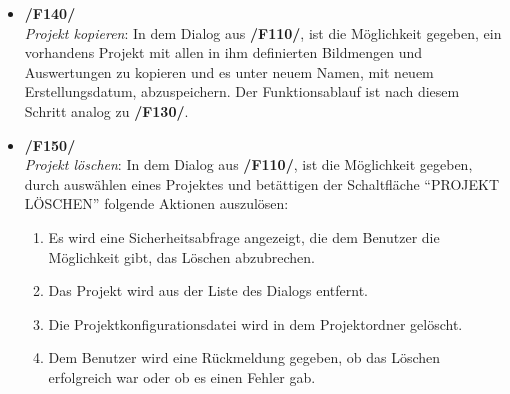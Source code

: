 \begin{itemize}
		\item \textbf{/F140/}\\ \textit{Projekt kopieren}: In dem Dialog aus \textbf{/F110/}, ist die Möglichkeit gegeben, ein vorhandens Projekt mit allen in ihm definierten Bildmengen und Auswertungen zu kopieren und es unter neuem Namen, mit neuem Erstellungsdatum, abzuspeichern. Der Funktionsablauf ist nach diesem Schritt analog zu \textbf{/F130/}.
		
		\item \textbf{/F150/}\\ \textit{Projekt löschen}: In dem Dialog aus \textbf{/F110/}, ist die Möglichkeit gegeben, durch auswählen eines Projektes und betättigen der Schaltfläche "`PROJEKT LÖSCHEN"' folgende Aktionen auszulösen:
			\begin{enumerate}
				\item Es wird eine Sicherheitsabfrage angezeigt, die dem Benutzer die Möglichkeit gibt, das Löschen abzubrechen.
				\item Das Projekt wird aus der Liste des Dialogs entfernt.
				\item Die Projektkonfigurationsdatei wird in dem Projektordner gelöscht.
				\item Dem Benutzer wird eine Rückmeldung gegeben, ob das Löschen erfolgreich war oder ob es einen Fehler gab.
			\end{enumerate}
	\end{itemize}


